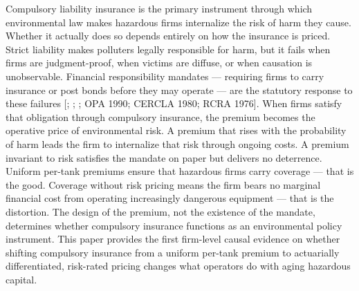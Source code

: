 \documentclass[
  12pt,
]{article}
\begin{document}
Compulsory liability insurance is the primary instrument through which
environmental law makes hazardous firms internalize the risk of harm
they cause. Whether it actually does so depends entirely on how the
insurance is priced. Strict liability makes polluters legally
responsible for harm, but it fails when firms are judgment-proof, when
victims are diffuse, or when causation is unobservable. Financial
responsibility mandates --- requiring firms to carry insurance or post
bonds before they may operate --- are the statutory response to these
failures {[}\citet{shavell1986}; \citet{shavell2004};
\citet{shavell2007}; OPA 1990; CERCLA 1980; RCRA 1976{]}. When firms
satisfy that obligation through compulsory insurance, the premium
becomes the operative price of environmental risk. A premium that rises
with the probability of harm leads the firm to internalize that risk
through ongoing costs. A premium invariant to risk satisfies the mandate
on paper but delivers no deterrence. Uniform per-tank premiums ensure
that hazardous firms carry coverage --- that is the good. Coverage
without risk pricing means the firm bears no marginal financial cost
from operating increasingly dangerous equipment --- that is the
distortion. The design of the premium, not the existence of the mandate,
determines whether compulsory insurance functions as an environmental
policy instrument. This paper provides the first firm-level causal
evidence on whether shifting compulsory insurance from a uniform
per-tank premium to actuarially differentiated, risk-rated pricing
changes what operators do with aging hazardous capital.
\end{document}

